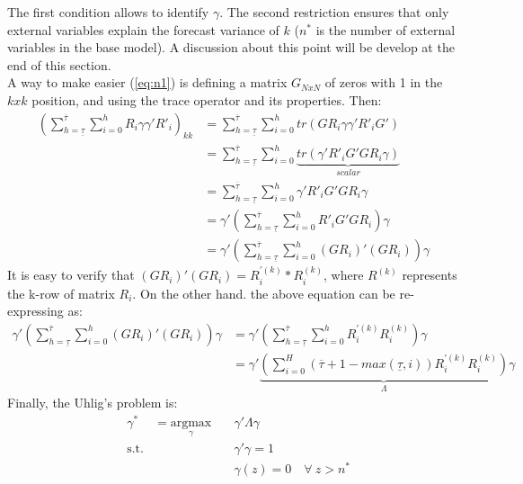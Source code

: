 \documentclass[12pt, a4paper]{article}
\begin{document}
The first condition allows to identify $\gamma$. The second restriction ensures that only external variables explain the forecast variance of $k$ ($n^*$ is the number of external variables in the base model). A discussion about this point will be develop at the end of this section. \\
A way to make easier (\ref{eq:n1}) is defining a matrix $G_{NxN}$ of zeros with 1 in the $kxk$ position, and using the trace operator and its properties. Then:
\begin{equation*}
\begin{aligned}
\left(\sum_{h = \underline{\tau}}^{\overline{\tau}}\sum_{i=0}^h R_{i}\gamma \gamma' R'_{i} \right)_{kk} & = \sum_{h = \underline{\tau}}^{\overline{\tau}}\sum_{i=0}^h tr(G R_{i}\gamma \gamma' R'_{i} G') \\
& = \sum_{h = \underline{\tau}}^{\overline{\tau}}\sum_{i=0}^h \underbrace{tr(\gamma' R'_{i} G'G R_{i}\gamma )}_{scalar} \\
& = \sum_{h = \underline{\tau}}^{\overline{\tau}}\sum_{i=0}^h \gamma' R'_{i} G'G R_{i}\gamma \\
& = \gamma' \left( \sum_{h =\underline{\tau}}^{\overline{\tau}}\sum_{i=0}^h  R'_{i} G'G R_{i} \right) \gamma \\
& = \gamma' \left( \sum_{h =\underline{\tau}}^{\overline{\tau}}\sum_{i=0}^h  (G R_{i})'(G R_{i}) \right) \gamma
\end{aligned}
\end{equation*}
It is easy to verify that $(G R_{i})'(G R_{i}) = R^{'(k)}_i*R^{(k)}_i$, where $R^{(k)}$ represents the k-row of matrix $R_i$. On the other hand. the above equation can be re-expressing as:
\begin{equation*}
\begin{aligned}
\gamma' \left( \sum_{h =\underline{\tau}}^{\overline{\tau}}\sum_{i=0}^h  (G R_{i})'(G R_{i}) \right) \gamma &= \gamma' \left( \sum_{h =\underline{\tau}}^{\overline{\tau}}\sum_{i=0}^h  R^{'(k)}_i R^{(k)}_i \right) \gamma \\ 
&= \gamma' \underbrace{\left(\sum_{i=0}^H (\overline{\tau}+1-max(\underline{\tau},i)) R^{'(k)}_iR^{(k)}_i \right)}_{\Lambda} \gamma
\end{aligned}
\end{equation*}
Finally, the Uhlig's problem is:
\begin{equation*}
\begin{aligned}
& \gamma^* &= \underset{\gamma}{\text{argmax}}  \quad
& \gamma' \Lambda  \gamma \\
& \text{s.t.} 
&  & \gamma' \gamma = 1 \\
&  & & \gamma(z)  = 0 \quad \forall \ z>n^*
\end{aligned}
\end{equation*}
\end{document}
